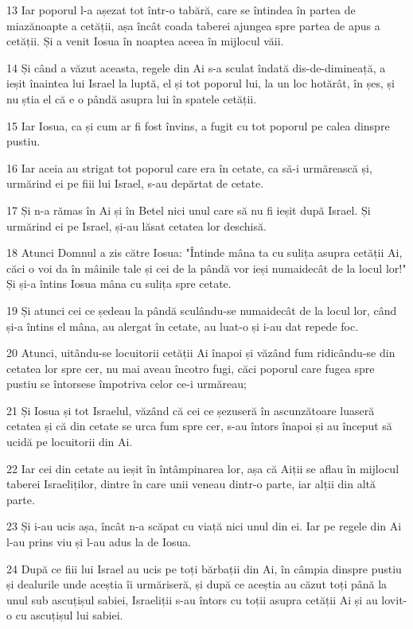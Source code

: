 \par 13 Iar poporul l-a așezat tot într-o tabără, care se întindea în partea de miazănoapte a cetății, așa încât coada taberei ajungea spre partea de apus a cetății. Și a venit Iosua în noaptea aceea în mijlocul văii.
\par 14 Și când a văzut aceasta, regele din Ai s-a sculat îndată dis-de-dimineață, a ieșit înaintea lui Israel la luptă, el și tot poporul lui, la un loc hotărât, în șes, și nu știa el că e o pândă asupra lui în spatele cetății.
\par 15 Iar Iosua, ca și cum ar fi fost învins, a fugit cu tot poporul pe calea dinspre pustiu.
\par 16 Iar aceia au strigat tot poporul care era în cetate, ca să-i urmărească și, urmărind ei pe fiii lui Israel, s-au depărtat de cetate.
\par 17 Și n-a rămas în Ai și în Betel nici unul care să nu fi ieșit după Israel. Și urmărind ei pe Israel, și-au lăsat cetatea lor deschisă.
\par 18 Atunci Domnul a zis către Iosua: "Întinde mâna ta cu sulița asupra cetății Ai, căci o voi da în mâinile tale și cei de la pândă vor ieși numaidecât de la locul lor!" Și și-a întins Iosua mâna cu sulița spre cetate.
\par 19 Și atunci cei ce ședeau la pândă sculându-se numaidecât de la locul lor, când și-a întins el mâna, au alergat în cetate, au luat-o și i-au dat repede foc.
\par 20 Atunci, uitându-se locuitorii cetății Ai înapoi și văzând fum ridicându-se din cetatea lor spre cer, nu mai aveau încotro fugi, căci poporul care fugea spre pustiu se întorsese împotriva celor ce-i urmăreau;
\par 21 Și Iosua și tot Israelul, văzând că cei ce șezuseră în ascunzătoare luaseră cetatea și că din cetate se urca fum spre cer, s-au întors înapoi și au început să ucidă pe locuitorii din Ai.
\par 22 Iar cei din cetate au ieșit în întâmpinarea lor, așa că Aiții se aflau în mijlocul taberei Israeliților, dintre în care unii veneau dintr-o parte, iar alții din altă parte.
\par 23 Și i-au ucis așa, încât n-a scăpat cu viață nici unul din ei. Iar pe regele din Ai l-au prins viu și l-au adus la de Iosua.
\par 24 După ce fiii lui Israel au ucis pe toți bărbații din Ai, în câmpia dinspre pustiu și dealurile unde aceștia îi urmăriseră, și după ce aceștia au căzut toți până la unul sub ascuțișul sabiei, Israeliții s-au întors cu toții asupra cetății Ai și au lovit-o cu ascuțișul lui sabiei.
